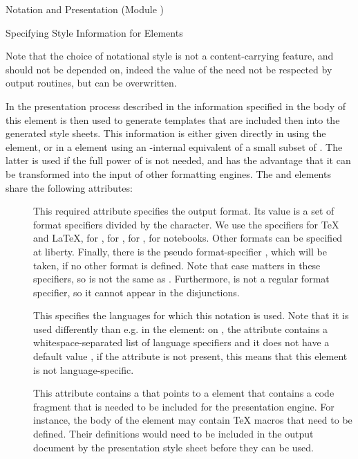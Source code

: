 \begin{tchapter}[id=pres,short=Notation and Presentation]{Notation and Presentation (Module {})}
\begin{tsection}[id=omstyle,short=Styling OMDoc Elements]{Specifying Style Information for {\omdoc} Elements}
\begin{description}
    Note that the choice of notational style is not a content-carrying feature,
    and should not be depended on, indeed the value of the
    {} need not be respected by output routines,
    but can be overwritten.
\end{description}
In the presentation process described in {} the information specified
in the body of this element is then used to generate {\xslt} templates that are included
then into the generated style sheets. This information is either given directly in {\xslt}
using the {} element, or in a {} element using an
{\omdoc}-internal equivalent of a small subset of {\xslt}. The latter is used if the full
power of {\xslt} is not needed, and has the advantage that it can be transformed into the
input of other formatting engines.  The {} and {} elements
share the following attributes:
\begin{description}
\item[{}] This required attribute specifies the output
  format. Its value is a set of format specifiers divided by the {\snippet{|}} character.
  We use the specifiers {} for {\TeX} and {\LaTeX},
  {} for {\pmathml}, {} for
  {\cmathml}, {} for {\html},
  {} for {\mathematica}
  notebooks. Other formats can be specified at liberty.
  Finally, there is the pseudo format-specifier {}, which
  will be taken, if no other format is defined.  Note that case matters in these
  specifiers, so {} is not the same as {}. Furthermore,
  {} is not a regular format specifier, so it cannot appear
  in the disjunctions.
\item[{}] This specifies the languages for
  which this notation is used. Note that it is used differently than e.g. in the
  {} element: on {}, the attribute
  {} contains a whitespace-separated list
  of language specifiers and it does not have a default value {}, if the
  attribute is not present, this means that this element is not language-specific.
\item[{}] This attribute contains a
  {} that points to a {} element that contains a
  code fragment that is needed to be included for the presentation engine. For instance,
  the body of the {} element may contain {\TeX} macros that need to be
  defined.  Their definitions would need to be included in the output document by the
  presentation style sheet before they can be used.
\end{description}


\end{tsection}
\end{tchapter}

